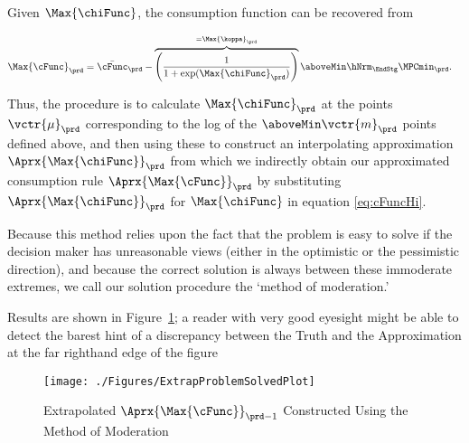 \documentclass[titlepage, headings=optiontotocandhead]{econark}
\begin{document}
  Given $\Max{\chiFunc}$, the consumption function can be recovered from



  \begin{equation}\begin{gathered}\begin{aligned}
        \Max{\cFunc}_{\prd}  & = \bar{\cFunc}_{\prd}-\overbrace{\left(\frac{1}{1+\exp(\Max{\chiFunc}_{\prd})}\right)}^{=\Max{\koppa}_{\prd}} \aboveMin \hNrm_{\EndStg} \MPCmin_{\prd}. \label{eq:cFuncHi}
      \end{aligned}\end{gathered}\end{equation}



  Thus, the procedure is to calculate $\Max{\chiFunc}_{\prd}$ at the points
  $\vctr{\mu}_{\prd}$ corresponding to the log of the $\aboveMin
  \vctr{m}_{\prd}$ points defined above, and then using these to construct an
  interpolating approximation $\Aprx{\Max{\chiFunc}}_{\prd}$ from which we indirectly obtain our
  approximated consumption rule $\Aprx{\Max{\cFunc}}_{\prd}$ by substituting $\Aprx{\Max{\chiFunc}}_{\prd}$ for $\Max{\chiFunc}$ in equation \eqref{eq:cFuncHi}.

  Because this method relies upon the fact that the problem is easy to
  solve if the decision maker has unreasonable views (either in the
  optimistic or the pessimistic direction), and because the correct
  solution is always between these immoderate extremes, we call our
  solution procedure the `method of moderation.'

  Results are shown in Figure~\ref{fig:ExtrapProblemSolved}; a reader
  with very good eyesight might be able to detect the barest hint of a
  discrepancy between the Truth and the Approximation at the far
  righthand edge of the figure
  \hypertarget{ExtrapProblemSolvedPlot}{}
  \begin{figure}
    \texttt{[image: ./Figures/ExtrapProblemSolvedPlot]}
    \caption{Extrapolated $\Aprx{\Max{\cFunc}}_{\prd-1}$ Constructed Using the Method of Moderation}
    \label{fig:ExtrapProblemSolved}
  \end{figure}
\end{document}
